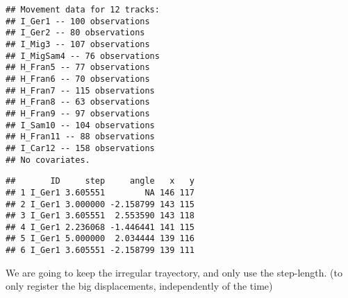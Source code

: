 \documentclass[
]{article}
\newenvironment{Shaded}{\begin{snugshade}}{\end{snugshade}}
\newcommand{\CommentTok}[1]{\textcolor[rgb]{0.56,0.35,0.01}{\textit{#1}}}
\newcommand{\FunctionTok}[1]{\textcolor[rgb]{0.00,0.00,0.00}{#1}}
\newcommand{\NormalTok}[1]{#1}
\begin{document}
\begin{verbatim}
## Movement data for 12 tracks:
## I_Ger1 -- 100 observations
## I_Ger2 -- 80 observations
## I_Mig3 -- 107 observations
## I_MigSam4 -- 76 observations
## H_Fran5 -- 77 observations
## H_Fran6 -- 70 observations
## H_Fran7 -- 115 observations
## H_Fran8 -- 63 observations
## H_Fran9 -- 97 observations
## I_Sam10 -- 104 observations
## H_Fran11 -- 88 observations
## I_Car12 -- 158 observations
## No covariates.
\end{verbatim}

\begin{Shaded}
\end{Shaded}

\begin{verbatim}
##       ID     step     angle   x   y
## 1 I_Ger1 3.605551        NA 146 117
## 2 I_Ger1 3.000000 -2.158799 143 115
## 3 I_Ger1 3.605551  2.553590 143 118
## 4 I_Ger1 2.236068 -1.446441 141 115
## 5 I_Ger1 5.000000  2.034444 139 116
## 6 I_Ger1 3.605551 -2.158799 139 111
\end{verbatim}

We are going to keep the irregular trayectory, and only use the
step-length. (to only register the big displacements, independently of
the time)
\end{document}

